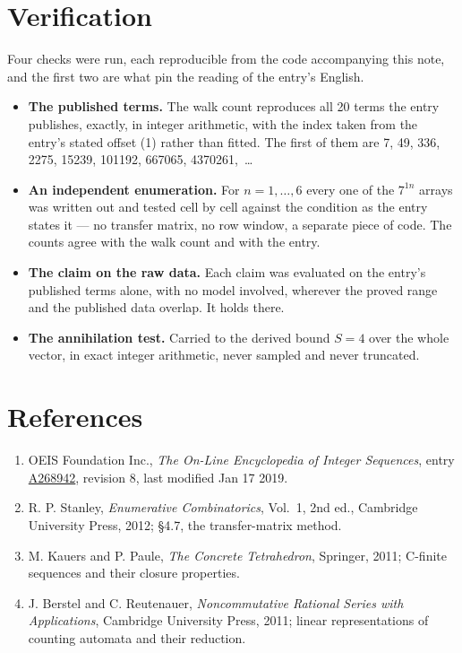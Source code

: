 \documentclass[11pt]{article}
\theoremstyle{definition}
\begin{document}
\section{Verification}

Four checks were run, each reproducible from the code accompanying this note, and the first two are what pin the reading of the entry's English.

\begin{itemize}

\item {\bfseries The published terms.} The walk count reproduces all 20 terms the entry publishes, exactly, in integer arithmetic, with the index taken from the entry's stated offset (1) rather than fitted. The first of them are 7, 49, 336, 2275, 15239, 101192, 667065, 4370261,~\dots

\item {\bfseries An independent enumeration.} For $n = 1,\dots,6$ every one of the $7^{1n}$ arrays was written out and tested cell by cell against the condition as the entry states it --- no transfer matrix, no row window, a separate piece of code. The counts agree with the walk count and with the entry.

\item {\bfseries The claim on the raw data.} Each claim was evaluated on the entry's published terms alone, with no model involved, wherever the proved range and the published data overlap. It holds there.

\item {\bfseries The annihilation test.} Carried to the derived bound $S = 4$ over the whole vector, in exact integer arithmetic, never sampled and never truncated.

\end{itemize}

\section{References}

\begin{enumerate}

\item OEIS Foundation Inc., \emph{The On-Line Encyclopedia of Integer Sequences}, entry \href{https://oeis.org/A268942}{A268942}, revision 8, last modified Jan 17 2019.

\item R. P. Stanley, \emph{Enumerative Combinatorics}, Vol.~1, 2nd ed., Cambridge University Press, 2012; \S4.7, the transfer-matrix method.

\item M. Kauers and P. Paule, \emph{The Concrete Tetrahedron}, Springer, 2011; C-finite sequences and their closure properties.

\item J. Berstel and C. Reutenauer, \emph{Noncommutative Rational Series with Applications}, Cambridge University Press, 2011; linear representations of counting automata and their reduction.

\end{enumerate}
\end{document}
